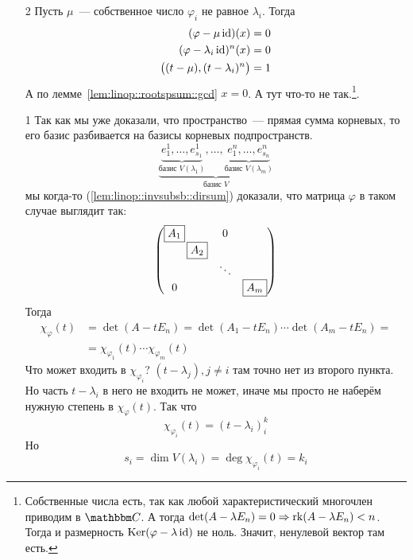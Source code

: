 \documentclass[12pt]{../../../notes}
\begin{document}
\begin{ittproof}
  \begin{enumerate}
    \item[2] Пусть $\mu$~--- собственное число $\varphi_i$ не равное $\lambda_i$.
      Тогда 
      \begin{align*}
        (\varphi - \mu \operatorname{id}) (x) = 0 \\
        (\varphi - \lambda_i \operatorname{id})^n (x) = 0 \\
        \big((t-\mu),(t-\lambda_i)^n\big) = 1
      \end{align*}
      А по лемме~\ref{lem:linop::rootspsum::gcd} $x=0$. А тут что-то не так.\footnote{Собственные числа есть, так как любой
      характеристический многочлен приводим в $\C$. А тогда $\det(A - \lambda E_n) = 0 \Rightarrow \operatorname{rk}(A - \lambda E_n) <
      n$. Тогда и  размерность $\operatorname{Ker} (\varphi - \lambda \operatorname{id})$ не ноль. Значит, ненулевой вектор там есть. }.

    \item[1] Так как мы уже доказали, что пространство~--- прямая сумма корневых, то его базис разбивается на базисы корневых
      подпространств.
      \[
        \underbrace{ \underbrace{e_1^1, \dotsc, e_{s_1}^1}_{\text{базис } V(\lambda_1)} , 
        \dotsc,  \underbrace{e_1^n, \dotsc, e_{s_n}^n}_{\text{базис } V(\lambda_m)}  }_{\text{базис } V}
      \]
      мы когда-то (\ref{lem:linop::invsubsb::dirsum}) доказали, что матрица $\varphi$ в таком случае выглядит так:
      \[
        \begin{pmatrix}
          \boxed{A_1} &    ~        &   0    &  \\
              ~       &\mkern -15mu \boxed{A_2} &   ~    &  \\
              ~       &    ~        & \ddots &  \\
              0       &    ~        &   ~    & \boxed{A_m}
        \end{pmatrix}
      \]
      Тогда 
      \[
        \begin{split}
          \chi_\varphi(t) &= \det (A - t E_n ) = \det (A_1 - t E_n) \dotsm \det (A_m - t E_n)  = \\
          &= \chi_{\varphi_1}(t) \dotsm \chi_{\varphi_m}(t)
        \end{split}
      \]
      Что может входить в $\chi_{\varphi_i}$? $(t - \lambda_j), j\neq i$ там точно нет из второго пункта.
      Но часть $t - \lambda_i$ в него не входить не может, иначе мы просто не наберём нужную степень в $\chi_\varphi(t)$.
      Так что 
      \[
        \chi_{\varphi_i}(t) = (t - \lambda_i)^k_i
      \]
      Но 
      \[
        s_i = \dim V(\lambda_i) = \deg \chi_{\varphi_i}(t) = k_i
      \]
  \end{enumerate}
\end{ittproof}
\end{document}
